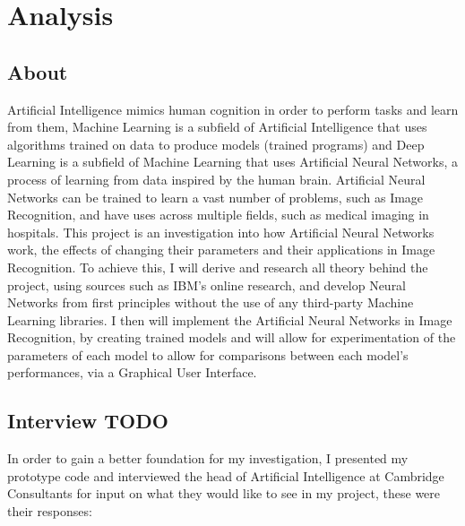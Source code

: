 \documentclass[./project-report/src/latex/project-report.tex]{subfiles}
\begin{document}
\maketitle

\section{Analysis}

\subsection{About}

Artificial Intelligence mimics human cognition in order to perform tasks and learn from them, Machine Learning is a subfield of Artificial Intelligence that uses 
algorithms trained on data to produce models (trained programs) and Deep Learning is a subfield of Machine Learning that uses Artificial Neural Networks, a process of 
learning from data inspired by the human brain. Artificial Neural Networks can be trained to learn a vast number of problems, such as Image Recognition, and have uses 
across multiple fields, such as medical imaging in hospitals. This project is an investigation into how Artificial Neural Networks work, the effects of changing their 
parameters and their applications in Image Recognition. To achieve this, I will derive and research all theory behind the project, using sources such as IBM's online 
research, and develop Neural Networks from first principles without the use of any third-party Machine Learning libraries. I then will implement the Artificial Neural 
Networks in Image Recognition, by creating trained models and will allow for experimentation of the parameters of each model to allow for comparisons between each 
model's performances, via a Graphical User Interface.

\subsection{Interview TODO}

In order to gain a better foundation for my investigation, I presented my prototype code and interviewed the head of Artificial Intelligence at Cambridge Consultants 
for input on what they would like to see in my project, these were their responses:


\end{document}
